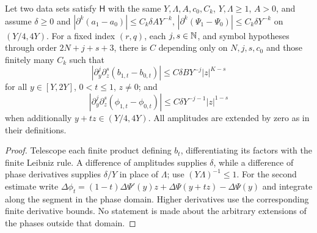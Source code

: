 \begin{lemma}
  \label{lem:c03_mult_difference_symbols}
  Let two data sets satisfy $\mathsf H$ with the same $Y,\Lambda,A,c_0,C_k$, $Y,\Lambda\ge1$, $A>0$,
  and assume $\delta\ge0$ and
  $|\partial^k(a_1-a_0)|\le C_k\delta A Y^{-k}$,
  $|\partial^k(\Psi_1-\Psi_0)|\le C_k\delta Y^{-k}$ on $(Y/4,4Y)$.
  For a fixed index $(r,q)$, each $j,s\in\mathbb{N}$, and symbol hypotheses through order $2N+j+s+3$,
  there is $C$ depending only on $N,j,s,c_0$ and those finitely many $C_k$ such that
  \[
    |\partial_y^j\partial_z^s(b_{1,t}-b_{0,t})|\le C\delta B Y^{-j}|z|^{K-s}
  \]
  for all $y\in[Y,2Y]$, $0<t\le1$, $z\ne0$; and
  \[
    |\partial_y^j\partial_z^s(\phi_{1,t}-\phi_{0,t})|
       \le C\delta Y^{-j-1}|z|^{1-s}
  \]
  when additionally $y+tz\in(Y/4,4Y)$. All amplitudes are extended by zero as in their definitions.
\end{lemma}
\begin{proof}
  Telescope each finite product defining $b_t$, differentiating its factors with the finite Leibniz rule.
  A difference of amplitudes supplies $\delta$, while a difference of phase derivatives supplies
  $\delta/Y$ in place of $\Lambda$; use $(Y\Lambda)^{-1}\le1$.
  For the second estimate write
  $\Delta\phi_t=(1-t)\Delta\Psi'(y)z+\Delta\Psi(y+tz)-\Delta\Psi(y)$ and integrate along
  the segment in the phase domain. Higher derivatives use the corresponding finite derivative bounds.
  No statement is made about the arbitrary extensions of the phases outside that domain.
\end{proof}

